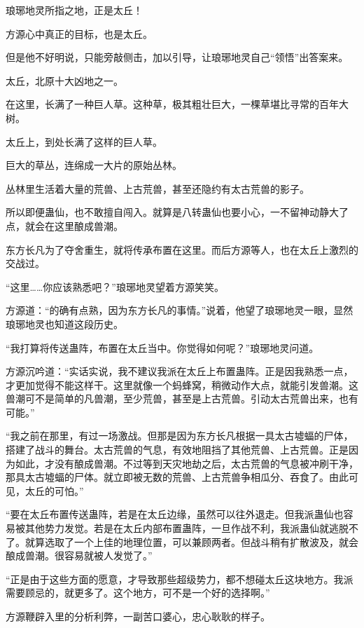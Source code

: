 
\begin{this_body}

琅琊地灵所指之地，正是太丘！

方源心中真正的目标，也是太丘。

但是他不好明说，只能旁敲侧击，加以引导，让琅琊地灵自己“领悟”出答案来。

太丘，北原十大凶地之一。

在这里，长满了一种巨人草。这种草，极其粗壮巨大，一棵草堪比寻常的百年大树。

太丘上，到处长满了这样的巨人草。

巨大的草丛，连绵成一大片的原始丛林。

丛林里生活着大量的荒兽、上古荒兽，甚至还隐约有太古荒兽的影子。

所以即便蛊仙，也不敢擅自闯入。就算是八转蛊仙也要小心，一不留神动静大了点，就会在这里酿成兽潮。

东方长凡为了夺舍重生，就将传承布置在这里。而后方源等人，也在太丘上激烈的交战过。

“这里……你应该熟悉吧？”琅琊地灵望着方源笑笑。

方源道：“的确有点熟，因为东方长凡的事情。”说着，他望了琅琊地灵一眼，显然琅琊地灵也知道这段历史。

“我打算将传送蛊阵，布置在太丘当中。你觉得如何呢？”琅琊地灵问道。

方源沉吟道：“实话实说，我不建议我派在太丘上布置蛊阵。正是因我熟悉一点，才更加觉得不能这样干。这里就像一个蚂蜂窝，稍微动作大点，就能引发兽潮。这兽潮可不是简单的凡兽潮，至少荒兽，甚至是上古荒兽。引动太古荒兽出来，也有可能。”

“我之前在那里，有过一场激战。但那是因为东方长凡根据一具太古墟蝠的尸体，搭建了战斗的舞台。太古荒兽的气息，有效地阻挡了其他荒兽、上古荒兽。正是因为如此，才没有酿成兽潮。不过等到天灾地劫之后，太古荒兽的气息被冲刷干净，那具太古墟蝠的尸体。就立即被无数的荒兽、上古荒兽争相瓜分、吞食了。由此可见，太丘的可怕。”

“要在太丘布置传送蛊阵，若是在太丘边缘，虽然可以往外退走。但我派蛊仙也容易被其他势力发觉。若是在太丘内部布置蛊阵，一旦作战不利，我派蛊仙就逃脱不了。就算选取了一个上佳的地理位置，可以兼顾两者。但战斗稍有扩散波及，就会酿成兽潮。很容易就被人发觉了。”

“正是由于这些方面的愿意，才导致那些超级势力，都不想碰太丘这块地方。我派需要顾忌的，就更多了。这个地方，可不是一个好的选择啊。”

方源鞭辟入里的分析利弊，一副苦口婆心，忠心耿耿的样子。


\end{this_body}
